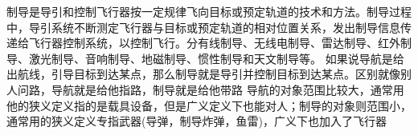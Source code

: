 制导是导引和控制飞行器按一定规律飞向目标或预定轨道的技术和方法。制导过程中，导引系统不断测定飞行器与目标或预定轨道的相对位置关系，发出制导信息传递给飞行器控制系统，以控制飞行。分有线制导、无线电制导、雷达制导、红外制导、激光制导、音响制导、地磁制导、惯性制导和天文制导等。
        如果说导航是给出航线，引导目标到达某点，那么制导就是导引并控制目标到达某点。区别就像别人问路，导航就是给他指路，制导就是给他带路
        导航的对象范围比较大，通常用他的狭义定义指的是载具设备，但是广义定义下也能对人；制导的对象则范围小，通常用的狭义定义专指武器(导弹，制导炸弹，鱼雷)，广义下也加入了飞行器